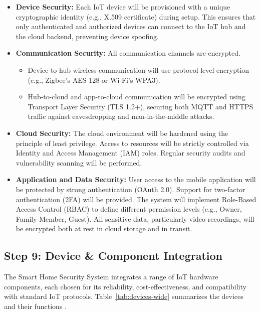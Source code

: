 \documentclass[conference]{IEEEtran}
\begin{document}
\begin{itemize}
    \item \textbf{Device Security:} Each IoT device will be provisioned with a unique cryptographic identity (e.g., X.509 certificate) during setup. This ensures that only authenticated and authorized devices can connect to the IoT hub and the cloud backend, preventing device spoofing.
    
    \item \textbf{Communication Security:} All communication channels are encrypted.
    \begin{itemize}
        \item Device-to-hub wireless communication will use protocol-level encryption (e.g., Zigbee's AES-128 or Wi-Fi's WPA3).
        \item Hub-to-cloud and app-to-cloud communication will be encrypted using Transport Layer Security (TLS 1.2+), securing both MQTT and HTTPS traffic against eavesdropping and man-in-the-middle attacks.
    \end{itemize}
    
    \item \textbf{Cloud Security:} The cloud environment will be hardened using the principle of least privilege. Access to resources will be strictly controlled via Identity and Access Management (IAM) roles. Regular security audits and vulnerability scanning will be performed.
    
    \item \textbf{Application and Data Security:} User access to the mobile application will be protected by strong authentication (OAuth 2.0). Support for two-factor authentication (2FA) will be provided. The system will implement Role-Based Access Control (RBAC) to define different permission levels (e.g., Owner, Family Member, Guest). All sensitive data, particularly video recordings, will be encrypted both at rest in cloud storage and in transit.
\end{itemize}

\subsection{Step 9: Device \& Component Integration}
The Smart Home Security System integrates a range of IoT hardware components, each chosen for its reliability, cost-effectiveness, and compatibility with standard IoT protocols. Table~\ref{tab:devices-wide} summarizes the devices and their functions \cite{seerangan_domain_specific_iot_home_automation_2022, tipirisetty_home_automation_case_study_2025, cisco_gateway, cisco_packettracer_iot}.
\end{document}
